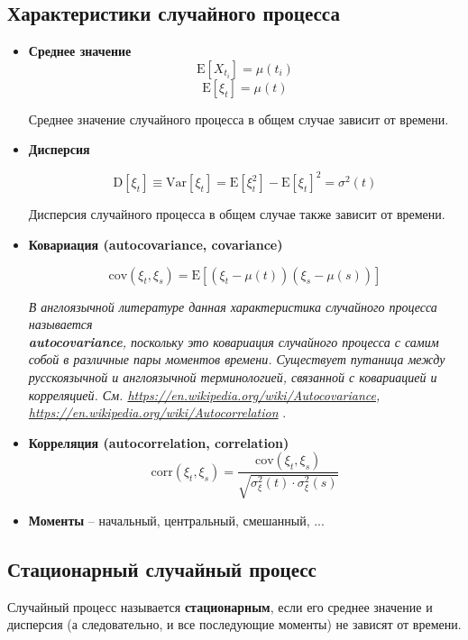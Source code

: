 \documentclass{article}
\begin{document}
\subsection{Характеристики случайного процесса}
\begin{itemize}
    \item{
        \textbf{Среднее значение}
        $$\textrm{E}[X_{t_i}] = \mu(t_i)$$
        $$\textrm{E}[\xi_t] = \mu(t)$$
        
        Среднее значение случайного процесса в общем случае зависит от времени.
    }

    \item{
        \textbf{Дисперсия}

        $$
        \textrm{D}[\xi_t] \equiv 
        \textrm{Var}[\xi_t] = 
        \textrm{E}[\xi_t^2] - \textrm{E}[\xi_t]^2 =
        \sigma^2(t)
        $$
        
        Дисперсия случайного процесса в общем случае также зависит от времени.
    }

    \item{
        \textbf{Ковариация (autocovariance, covariance)}

        $$\textrm{cov}(\xi_t, \xi_s) = \textrm{E}[(\xi_t - \mu(t))(\xi_s - \mu(s))]$$

        \textit{В англоязычной литературе данная характеристика случайного процесса называется \\\textbf{autocovariance}, поскольку это ковариация случайного процесса с самим собой в различные пары моментов времени. Существует путаница между русскоязычной и англоязычной терминологией, связанной с ковариацией и корреляцией. См. \href{https://en.wikipedia.org/wiki/Autocovariance}{https://en.wikipedia.org/wiki/Autocovariance},\\ \href{https://en.wikipedia.org/wiki/Autocorrelation}{https://en.wikipedia.org/wiki/Autocorrelation}
        }.
    }

    \item{
        \textbf{Корреляция (autocorrelation, correlation)}
        $$\textrm{corr}(\xi_t, \xi_s) = \frac{\textrm{cov}(\xi_t, \xi_s)}{\sqrt{\sigma_{\xi}^2(t) \cdot \sigma_{\xi}^2(s)}} $$
    }

    \item{\textbf{Моменты} -- начальный, центральный, смешанный, ...}
\end{itemize}

\subsection{Стационарный случайный процесс}
Случайный процесс называется \textbf{стационарным}, если его среднее значение и дисперсия (а следовательно, и все последующие моменты) не зависят от времени.
\end{document}
